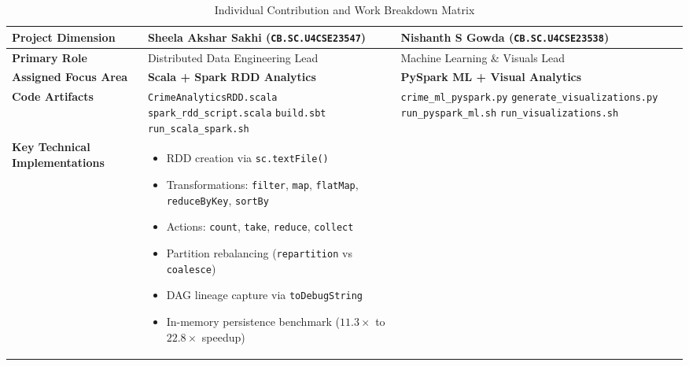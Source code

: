 \documentclass[11pt,a4paper]{article}
\begin{document}
\begin{table}[H]
    \centering
    \small
    \renewcommand{\arraystretch}{1.25}
    \caption{Individual Contribution and Work Breakdown Matrix}
    \label{tab:contribution_matrix}
    \begin{tabular}{p{3.2cm}p{5.8cm}p{5.8cm}}
        \toprule
        \textbf{Project Dimension} & \textbf{Sheela Akshar Sakhi} (\texttt{CB.SC.U4CSE23547}) & \textbf{Nishanth S Gowda} (\texttt{CB.SC.U4CSE23538}) \\
        \midrule
        \textbf{Primary Role} & Distributed Data Engineering Lead & Machine Learning \& Visuals Lead \\
        \midrule
        \textbf{Assigned Focus Area} & \textbf{Scala + Spark RDD Analytics} & \textbf{PySpark ML + Visual Analytics} \\
        \midrule
        \textbf{Code Artifacts} & 
        \texttt{CrimeAnalyticsRDD.scala}\newline
        \texttt{spark\_rdd\_script.scala}\newline
        \texttt{build.sbt}\newline
        \texttt{run\_scala\_spark.sh} & 
        \texttt{crime\_ml\_pyspark.py}\newline
        \texttt{generate\_visualizations.py}\newline
        \texttt{run\_pyspark\_ml.sh}\newline
        \texttt{run\_visualizations.sh} \\
        \midrule
        \textbf{Key Technical Implementations} & 
        \begin{itemize}[leftmargin=*,noitemsep,topsep=0pt]
            \item RDD creation via \texttt{sc.textFile()}
            \item Transformations: \texttt{filter}, \texttt{map}, \texttt{flatMap}, \texttt{reduceByKey}, \texttt{sortBy}
            \item Actions: \texttt{count}, \texttt{take}, \texttt{reduce}, \texttt{collect}
            \item Partition rebalancing (\texttt{repartition} vs \texttt{coalesce})
            \item DAG lineage capture via \texttt{toDebugString}
            \item In-memory persistence benchmark ($11.3\times$ to $22.8\times$ speedup)
        \end{itemize} & 
        \begin{itemize}[leftmargin=*,noitemsep,topsep=0pt]

\end{itemize}
\end{tabular}
\end{table}
\end{document}
